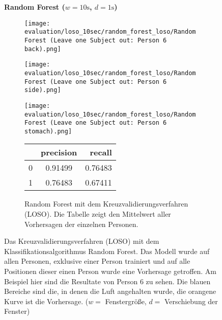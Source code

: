 \begin{figure}[H]
    \newline
    \textbf{Random Forest ($w=10\si{\s}$, $d=1\si{\s}$)}
    \begin{subfigure}{1\textwidth}
      \texttt{[image: evaluation/loso\_10sec/random\_forest\_loso/Random Forest (Leave one Subject out: Person 6 back).png]}
    \end{subfigure}
    \begin{subfigure}{1\textwidth}
      \texttt{[image: evaluation/loso\_10sec/random\_forest\_loso/Random Forest (Leave one Subject out: Person 6 side).png]}
    \end{subfigure}
    \begin{subfigure}{1\textwidth}
      \texttt{[image: evaluation/loso\_10sec/random\_forest\_loso/Random Forest (Leave one Subject out: Person 6 stomach).png]}
  \end{subfigure}

  \begin{subfigure}{1\textwidth}
      \begin{center}
          \begin{tabular}{ | l | c | r | }
            \hline
             & precision & recall \\ \hline
            0 & 0.91499 & 0.76483 \\ \hline
            1 & 0.76483 & 0.67411 \\
            \hline
          \end{tabular}
      \end{center}
      \caption{Random Forest mit dem Kreuzvalidierungsverfahren (LOSO). Die Tabelle zeigt den Mittelwert aller Vorhersagen der einzelnen Personen.}
      \label{implementation:app:screenshots:user_studies_information}
  \end{subfigure}
    \caption{Das Kreuzvalidierungsverfahren (LOSO) mit dem Klassifikationsalgorithmus Random Forest. Das Modell wurde auf allen Personen, exklusive einer Person trainiert und auf alle Positionen dieser einen Person wurde eine Vorhersage getroffen. Am Beispiel hier sind die Resultate von Person 6 zu sehen. Die blauen Bereiche sind die, in denen die Luft angehalten wurde, die orangene Kurve ist die Vorhersage. ($w=$ Fenstergröße, $d=$ Verschiebung der Fenster)}
\label{evaluation:random_forest_loso:person6}
\end{figure}

